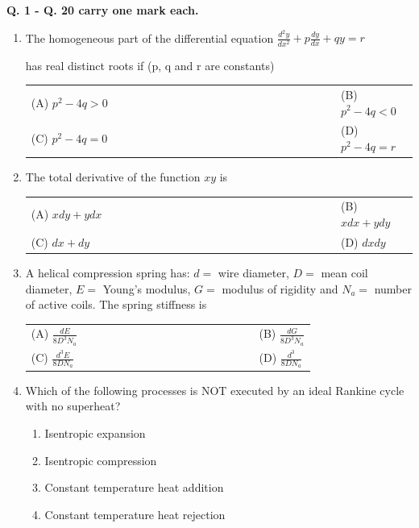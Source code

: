 \documentclass[a4paper,12pt]{article}
\begin{document}
\newpage
\vspace*{-\topskip}
 
\textbf{Q. 1 - Q. 20 carry one mark each.}

\begin{enumerate}[label=Q.\arabic*, leftmargin=*]

\item The homogeneous part of the differential equation
$\frac{d^2 y}{dx^2} + p \frac{dy}{dx} + q y = r$

has real distinct roots if (p, q and r are constants)
\begin{multicols}{2}
\begin{tabular}[t]{p{0.8\linewidth} p{0.9\linewidth}}
(A) $p^2 - 4q > 0$ & (B) $p^2 - 4q < 0$ \\
(C) $p^2 - 4q = 0$ & (D) $p^2 - 4q = r$ \\
\end{tabular}
\end{multicols}

\item The total derivative of the function $xy$ is
\begin{multicols}{2}
\begin{tabular}[t]{p{0.8\linewidth} p{0.9\linewidth}}
(A) $x dy + ydx$ & (B) $xdx + ydy$ \\
(C) $dx + dy$ & (D) $dx dy$ \\
\end{tabular}
\end{multicols}

\item A helical compression spring has: \( d = \) wire diameter, \( D = \) mean coil diameter, \( E = \) Young's modulus, \( G = \) modulus of rigidity and \( N_a = \) number of active coils. The spring stiffness is
\begin{multicols}{2}
\begin{tabular}[t]{p{0.8\linewidth} p{0.9\linewidth}}
(A) $\frac{d E}{8 D^{3} N_a}$ & (B) $\frac{d G}{8 D^{3} N_a}$ \\
(C) $\frac{d^{3} E}{8 D N_a}$ & (D) $\frac{d^{3}}{8 D N_a}$ \\
\end{tabular}
\end{multicols}

\item Which of the following processes is NOT executed by an ideal Rankine cycle with no superheat?
\begin{enumerate}[label=(\Alph*)]
\item Isentropic expansion
\item Isentropic compression
\item Constant temperature heat addition
\item Constant temperature heat rejection
\end{enumerate}


\end{enumerate}
\end{document}

